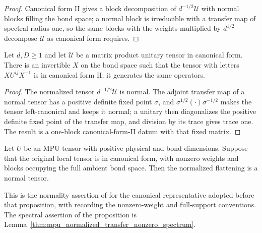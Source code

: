 \begin{proof}\leanok
    Canonical form II gives a block decomposition of $d^{-1/2}\mathcal U$ with
    normal blocks filling the bond space; a normal block is irreducible with a
    transfer map of spectral radius one, so the same blocks with the weights
    multiplied by $d^{1/2}$ decompose $\mathcal U$ as canonical form requires.
\end{proof}

\begin{lemma}
    \label{thm:mpu_canonical_form_similar_cfii}
    \leanok
    Let $d,D\geq1$ and let $\mathcal U$ be a matrix product unitary tensor in
    canonical form. There is an invertible $X$ on the bond space such that the
    tensor with letters $XU^{ij}X^{-1}$ is in canonical form II; it generates
    the same operators.
\end{lemma}

\begin{proof}\leanok
    The normalized tensor $d^{-1/2}\mathcal U$ is normal. The adjoint transfer
    map of a normal tensor has a positive definite fixed point $\sigma$, and
    $\sigma^{1/2}(\cdot)\sigma^{-1/2}$ makes the tensor left-canonical and keeps
    it normal; a unitary then diagonalizes the positive definite fixed point of
    the transfer map, and division by its trace gives trace one. The result is
    a one-block canonical-form-II datum with that fixed matrix.
\end{proof}

\begin{lemma}
    \label{thm:mpu_normalized_full_support_normal}
    \leanok
    Let $U$ be an MPU tensor with positive physical and bond dimensions.
    Suppose that the original local tensor is in canonical form, with nonzero
    weights and blocks occupying the full ambient bond space. Then the
    normalized flattening is a normal tensor.

    This is the normality assertion of
    \cite[Proposition~III.1]{Cirac2017MPU} for the canonical
    representative adopted before that proposition, with \cite{gap:mpu_canonical_form_nonzero_weights,gap:mpu_canonical_form_full_support} recording the nonzero-weight and
    full-support
    conventions.
    The spectral assertion of the proposition is
    Lemma~\ref{thm:mpu_normalized_transfer_nonzero_spectrum}.
\end{lemma}

